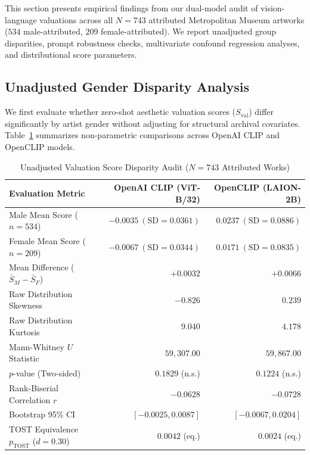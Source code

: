 \documentclass[pdflatex,sn-mathphys-num]{sn-jnl}%
\theoremstyle{thmstyleone}%
\theoremstyle{thmstyletwo}%
\theoremstyle{thmstylethree}%
\begin{document}
This section presents empirical findings from our dual-model audit of vision-language valuations across all $N=743$ attributed Metropolitan Museum artworks ($534$ male-attributed, $209$ female-attributed). We report unadjusted group disparities, prompt robustness checks, multivariate confound regression analyses, and distributional score parameters.

\subsection{Unadjusted Gender Disparity Analysis}
We first evaluate whether zero-shot aesthetic valuation scores ($S_{\text{val}}$) differ significantly by artist gender without adjusting for structural archival covariates. Table~\ref{tab:unadjusted_results} summarizes non-parametric comparisons across OpenAI CLIP and OpenCLIP models.

\begin{table}[h]
\caption{Unadjusted Valuation Score Disparity Audit ($N=743$ Attributed Works)}
\label{tab:unadjusted_results}
\centering
\small
\begin{tabular}{lrr}
\toprule
\textbf{Evaluation Metric} & \textbf{OpenAI CLIP (ViT-B/32)} & \textbf{OpenCLIP (LAION-2B)} \\
\midrule
Male Mean Score ($n=534$) & $-0.0035 \ (\text{SD} = 0.0361)$ & $0.0237 \ (\text{SD} = 0.0886)$ \\
Female Mean Score ($n=209$) & $-0.0067 \ (\text{SD} = 0.0344)$ & $0.0171 \ (\text{SD} = 0.0835)$ \\
Mean Difference ($\bar{S}_M - \bar{S}_F$) & $+0.0032$ & $+0.0066$ \\
Raw Distribution Skewness & $-0.826$ & $0.239$ \\
Raw Distribution Kurtosis & $9.040$ & $4.178$ \\
\midrule
Mann-Whitney $U$ Statistic & $59,307.00$ & $59,867.00$ \\
$p$-value (Two-sided) & $0.1829$ (n.s.) & $0.1224$ (n.s.) \\
Rank-Biserial Correlation $r$ & $-0.0628$ & $-0.0728$ \\
Bootstrap 95\% CI & $[-0.0025, 0.0087]$ & $[-0.0067, 0.0204]$ \\
TOST Equivalence $p_{\text{TOST}}$ ($d=0.30$) & $0.0042$ (eq.) & $0.0024$ (eq.) \\
\bottomrule
\end{tabular}
\end{table}
\end{document}
